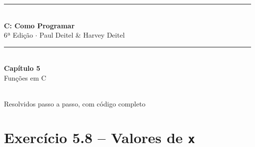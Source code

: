 \documentclass[12pt,a4paper]{article}
\begin{document}
\begin{titlepage}
  \centering\vspace*{2cm}
  {\color{deitelblue}\rule{\linewidth}{2pt}}\\[0.4cm]
  {\huge\bfseries\color{deitelblue}C: Como Programar}\\[0.2cm]
  {\large\color{deitelblue}6ª Edição $\cdot$ Paul Deitel \& Harvey Deitel}\\[0.2cm]
  {\color{deitelblue}\rule{\linewidth}{2pt}}\\[1cm]
  {\LARGE\bfseries Capítulo 5}\\[0.3cm]
  {\Large\color{deitelblue!80}Funções em C}\\[0.8cm]
  \begin{tcolorbox}[colback=deitellightblue,colframe=deitelblue,width=0.85\linewidth]
    \\[0.2cm]
    {\normalsize Resolvidos passo a passo, com código completo}
  \end{tcolorbox}
\end{titlepage}

\tableofcontents\newpage

\section{Exercício 5.8 -- Valores de \texttt{x}}
\end{document}
